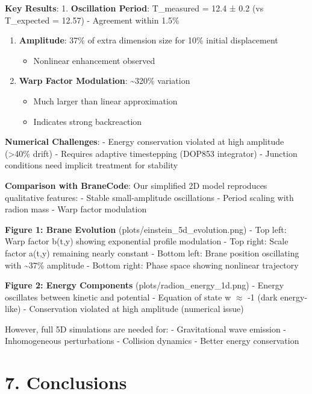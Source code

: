 \documentclass[
  11pt,
]{report}
\providecommand{\tightlist}{%
  \setlength{\itemsep}{0pt}\setlength{\parskip}{0pt}}
\begin{document}
\textbf{Key Results}: 1. \textbf{Oscillation Period}: T\_measured = 12.4
± 0.2 (vs T\_expected = 12.57) - Agreement within 1.5\%

\begin{enumerate}
\def\labelenumi{\arabic{enumi}.}
\setcounter{enumi}{1}
\tightlist
\item
  \textbf{Amplitude}: 37\% of extra dimension size for 10\% initial
  displacement

  \begin{itemize}
  \tightlist
  \item
    Nonlinear enhancement observed
  \end{itemize}
\item
  \textbf{Warp Factor Modulation}: \textasciitilde320\% variation

  \begin{itemize}
  \tightlist
  \item
    Much larger than linear approximation
  \item
    Indicates strong backreaction
  \end{itemize}
\end{enumerate}

\textbf{Numerical Challenges}: - Energy conservation violated at high
amplitude (\textgreater40\% drift) - Requires adaptive timestepping
(DOP853 integrator) - Junction conditions need implicit treatment for
stability

\textbf{Comparison with BraneCode}: Our simplified 2D model reproduces
qualitative features: - Stable small-amplitude oscillations - Period
scaling with radion mass - Warp factor modulation

\textbf{Figure 1: Brane Evolution} (plots/einstein\_5d\_evolution.png) -
Top left: Warp factor b(t,y) showing exponential profile modulation -
Top right: Scale factor a(t,y) remaining nearly constant - Bottom left:
Brane position oscillating with \textasciitilde37\% amplitude - Bottom
right: Phase space showing nonlinear trajectory

\textbf{Figure 2: Energy Components} (plots/radion\_energy\_1d.png) -
Energy oscillates between kinetic and potential - Equation of state w
\(\approx\) -1 (dark energy-like) - Conservation violated at high
amplitude (numerical issue)

However, full 5D simulations are needed for: - Gravitational wave
emission - Inhomogeneous perturbations - Collision dynamics - Better
energy conservation

\section{7. Conclusions}\label{conclusions}
\end{document}
